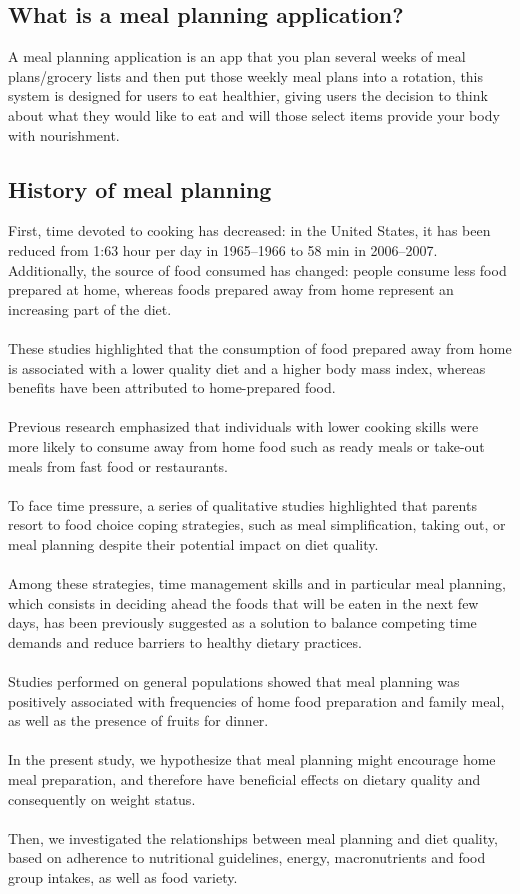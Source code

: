 \subsection{What is a meal planning application?}

A meal planning application is an app that you plan several weeks of meal plans/grocery lists and then put those weekly meal plans into a rotation, this system is designed for users to eat healthier, giving users the decision to think about what they would like to eat and will those select items provide your body with nourishment.

\subsection{History of meal planning}

First, time devoted to cooking has decreased: in the United States, it has been reduced from 1:63 hour per day in 1965–1966 to 58 min in 2006–2007. Additionally, the source of food consumed has changed: people consume less food prepared at home, whereas foods prepared away from home represent an increasing part of the diet. \\ \\
These studies highlighted that the consumption of food prepared away from home is associated with a lower quality diet and a higher body mass index, whereas benefits have been attributed to home-prepared food. \\ \\
Previous research emphasized that individuals with lower cooking skills were more likely to consume away from home food such as ready meals or take-out meals from fast food or restaurants. \\ \\
To face time pressure, a series of qualitative studies highlighted that parents resort to food choice coping strategies, such as meal simplification, taking out, or meal planning despite their potential impact on diet quality. \\ \\
Among these strategies, time management skills and in particular meal planning, which consists in deciding ahead the foods that will be eaten in the next few days, has been previously suggested as a solution to balance competing time demands and reduce barriers to healthy dietary practices. \\ \\
Studies performed on general populations showed that meal planning was positively associated with frequencies of home food preparation and family meal, as well as the presence of fruits for dinner. \\ \\
In the present study, we hypothesize that meal planning might encourage home meal preparation, and therefore have beneficial effects on dietary quality and consequently on weight status. \\  \\
Then, we investigated the relationships between meal planning and diet quality, based on adherence to nutritional guidelines, energy, macronutrients and food group intakes, as well as food variety.

